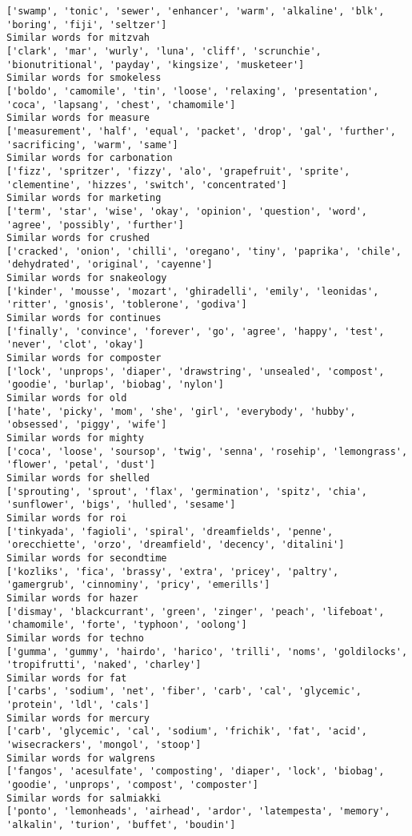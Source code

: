 \documentclass[11pt]{article}
\begin{document}
\begin{Verbatim}[commandchars=\\\{\}]
['swamp', 'tonic', 'sewer', 'enhancer', 'warm', 'alkaline', 'blk', 'boring', 'fiji', 'seltzer']
Similar words for mitzvah
['clark', 'mar', 'wurly', 'luna', 'cliff', 'scrunchie', 'bionutritional', 'payday', 'kingsize', 'musketeer']
Similar words for smokeless
['boldo', 'camomile', 'tin', 'loose', 'relaxing', 'presentation', 'coca', 'lapsang', 'chest', 'chamomile']
Similar words for measure
['measurement', 'half', 'equal', 'packet', 'drop', 'gal', 'further', 'sacrificing', 'warm', 'same']
Similar words for carbonation
['fizz', 'spritzer', 'fizzy', 'alo', 'grapefruit', 'sprite', 'clementine', 'hizzes', 'switch', 'concentrated']
Similar words for marketing
['term', 'star', 'wise', 'okay', 'opinion', 'question', 'word', 'agree', 'possibly', 'further']
Similar words for crushed
['cracked', 'onion', 'chilli', 'oregano', 'tiny', 'paprika', 'chile', 'dehydrated', 'original', 'cayenne']
Similar words for snakeology
['kinder', 'mousse', 'mozart', 'ghiradelli', 'emily', 'leonidas', 'ritter', 'gnosis', 'toblerone', 'godiva']
Similar words for continues
['finally', 'convince', 'forever', 'go', 'agree', 'happy', 'test', 'never', 'clot', 'okay']
Similar words for composter
['lock', 'unprops', 'diaper', 'drawstring', 'unsealed', 'compost', 'goodie', 'burlap', 'biobag', 'nylon']
Similar words for old
['hate', 'picky', 'mom', 'she', 'girl', 'everybody', 'hubby', 'obsessed', 'piggy', 'wife']
Similar words for mighty
['coca', 'loose', 'soursop', 'twig', 'senna', 'rosehip', 'lemongrass', 'flower', 'petal', 'dust']
Similar words for shelled
['sprouting', 'sprout', 'flax', 'germination', 'spitz', 'chia', 'sunflower', 'bigs', 'hulled', 'sesame']
Similar words for roi
['tinkyada', 'fagioli', 'spiral', 'dreamfields', 'penne', 'orecchiette', 'orzo', 'dreamfield', 'decency', 'ditalini']
Similar words for secondtime
['kozliks', 'fica', 'brassy', 'extra', 'pricey', 'paltry', 'gamergrub', 'cinnominy', 'pricy', 'emerills']
Similar words for hazer
['dismay', 'blackcurrant', 'green', 'zinger', 'peach', 'lifeboat', 'chamomile', 'forte', 'typhoon', 'oolong']
Similar words for techno
['gumma', 'gummy', 'hairdo', 'harico', 'trilli', 'noms', 'goldilocks', 'tropifrutti', 'naked', 'charley']
Similar words for fat
['carbs', 'sodium', 'net', 'fiber', 'carb', 'cal', 'glycemic', 'protein', 'ldl', 'cals']
Similar words for mercury
['carb', 'glycemic', 'cal', 'sodium', 'frichik', 'fat', 'acid', 'wisecrackers', 'mongol', 'stoop']
Similar words for walgrens
['fangos', 'acesulfate', 'composting', 'diaper', 'lock', 'biobag', 'goodie', 'unprops', 'compost', 'composter']
Similar words for salmiakki
['ponto', 'lemonheads', 'airhead', 'ardor', 'latempesta', 'memory', 'alkalin', 'turion', 'buffet', 'boudin']

\end{Verbatim}
\end{document}
